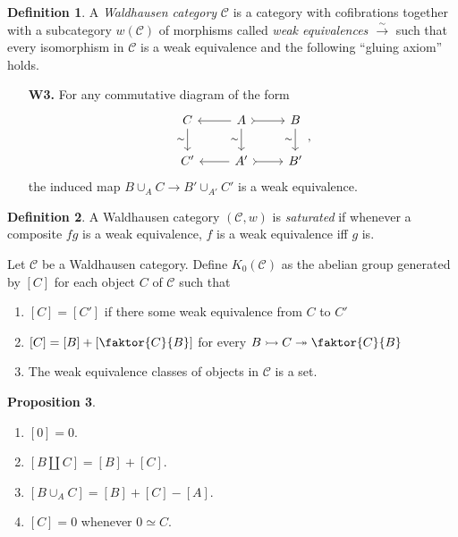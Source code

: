 \documentclass[10pt,letterpaper,cm]{nupset}
\theoremstyle{definition}
\newtheorem{definition}{Definition}[section]
\theoremstyle{theorem}
\newtheorem{prop}[definition]{Proposition}
\theoremstyle{remark}
\newcommand{\1}{\mathbf{1}}
\renewcommand{\c}{\mathscr{C}}
\newcommand{\0}{\vec 0}
\begin{document}
\begin{definition}
A \textit{Waldhausen category} $\c$ is a category with cofibrations together with a subcategory $w(\c)$ of morphisms called \textit{weak equivalences $\overset{\sim}{\longrightarrow}$} such that every isomorphism in $\c$ is a weak equivalence and the following ``gluing axiom'' holds.
\begin{itemize}
\item[\textbf{W3.}] For any commutative diagram of the form
\[
\begin{tikzcd}
C \arrow[d, "\sim"'] & A \arrow[d, "\sim"'] \arrow[r, tail] \arrow[l] & B \arrow[d, "\sim"'] \\
C' & A' \arrow[r, tail] \arrow[l] & B'
\end{tikzcd}, \]
the induced map $B \cup_A C \to  B' \cup_{A'} C'$ is a weak equivalence.
\end{itemize}
\end{definition}

\begin{definition}
A Waldhausen category $\left(\c, w\right)$ is \textit{saturated} if whenever a composite $fg$ is a weak equivalence, $f$ is a weak equivalence iff $g$ is. 
\end{definition}

\smallskip

Let $\c$ be a Waldhausen category. Define $K_0(\c)$ as the abelian group generated by $[C]$ for each object $C$ of $\c$ such that
\begin{enumerate}
\item $[C] = [C']$ if there some weak equivalence from $C$ to $C'$
\item $[C] = [B] + \left[\faktor{C}{B}\right]$ for every $B \rightarrowtail  C \twoheadrightarrow \faktor{C}{B}$
\item The weak equivalence classes of objects in $\c$ is a set.
\end{enumerate}


\begin{prop} $ $
\begin{enumerate}
\item $[0] = 0$.
\item $\left[B \coprod C\right] = [B] +[C]$.
\item $\left[B \cup_A C\right] = [B]+[C]-[A]$.
\item $[C]= 0$ whenever $0 \simeq C$.
\end{enumerate}
\end{prop}
\end{document}
